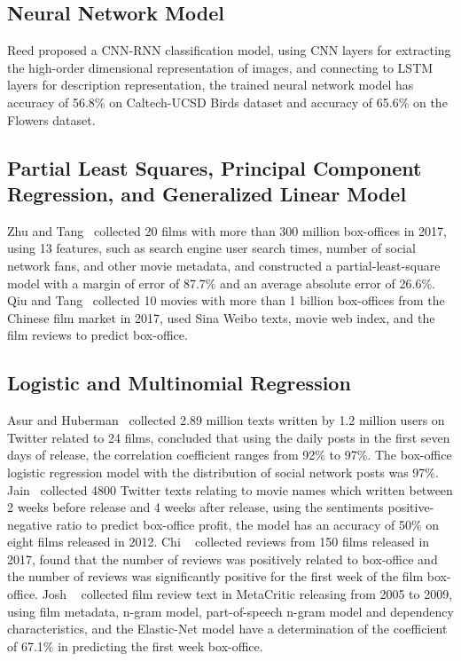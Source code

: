 \documentclass[review]{cvpr}
\begin{document}
\subsection{Neural Network Model}

  Reed \etal proposed a CNN-RNN classification model, using CNN layers for extracting the high-order dimensional representation of images,
  and connecting to LSTM layers for description representation, the trained neural network model has accuracy of 56.8\% on Caltech-UCSD Birds dataset and accuracy of 65.6\% on the Flowers dataset.


\subsection{Partial Least Squares, Principal Component Regression, and Generalized Linear Model}

  Zhu and Tang~\cite{zhu2019film} collected 20 films with more than 300 million box-offices in 2017, using 13 features, such as search engine user search times, number of social network fans, and other movie metadata,
  and constructed a partial-least-square model with a margin of error of 87.7\% and an average absolute error of 26.6\%.
  Qiu and Tang~\cite{qiu2018microblog} collected 10 movies with more than 1 billion box-offices from the Chinese film market in 2017, used Sina Weibo texts, movie web index, and the film reviews to predict box-office.

\subsection{Logistic and Multinomial Regression}

  Asur and Huberman~\cite{asur2010predicting} collected 2.89 million texts written by 1.2 million users on Twitter related to 24 films,
  concluded that using the daily posts in the first seven days of release, the correlation coefficient ranges from 92\% to 97\%.
  The box-office logistic regression model with the distribution of social network posts was 97\%.
  Jain~\cite{jain2013prediction} collected 4800 Twitter texts relating to movie names which written between 2 weeks before release and 4 weeks after release,
  using the sentiments positive-negative ratio to predict box-office profit, the model has an accuracy of 50\% on eight films released in 2012.
  Chi \etal~\cite{chi2019does} collected reviews from 150 films released in 2017, found that the number of reviews was positively related to box-office
  and the number of reviews was significantly positive for the first week of the film box-office.
  Josh \etal~\cite{joshi2010movie} collected film review text in MetaCritic releasing from 2005 to 2009, using film metadata, n-gram model,
  part-of-speech n-gram model and dependency characteristics, and the Elastic-Net model have a determination of the coefficient of 67.1\% in predicting the first week box-office.
\end{document}

